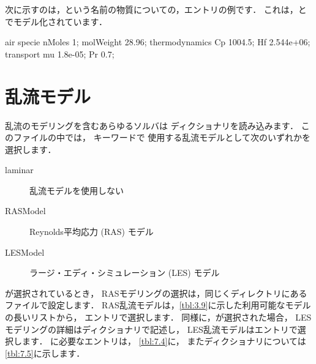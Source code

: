 次に示すのは，という名前の物質についての，エントリの例です．
これは，とでモデル化されています．
\begin{OFverbatim}[file]
air
{
    specie
    {
        nMoles          1;
        molWeight       28.96;
    }
    thermodynamics
    {
        Cp              1004.5;
        Hf              2.544e+06;
    }
    transport
    {
        mu              1.8e-05;
        Pr              0.7;
    }
}
\end{OFverbatim}



\section{乱流モデル}
\label{sec:7.2}
乱流のモデリングを含むあらゆるソルバは
%
%
ディクショナリを読み込みます．
このファイルの中では，
%
%
キーワードで
使用する乱流モデルとして次のいずれかを選択します．
\begin{description}
 \item[laminar]
%
%
            乱流モデルを使用しない
 \item[RASModel]
%
%
            Reynolds平均応力 (RAS) モデル
 \item[LESModel]
%
%
            ラージ・エディ・シミュレーション (LES) モデル
\end{description}

が選択されているとき，
RASモデリングの選択は，同じくディレクトリにある
ファイルで設定します．
RAS乱流モデルは，\autoref{tbl:3.9}に示した利用可能なモデルの長いリストから，
エントリで選択します．
同様に，が選択された場合，
LESモデリングの詳細はディクショナリで記述し，
LES乱流モデルはエントリで選択します．
に必要なエントリは，
\autoref{tbl:7.4}に，
またディクショナリについては
\autoref{tbl:7.5}に示します．


